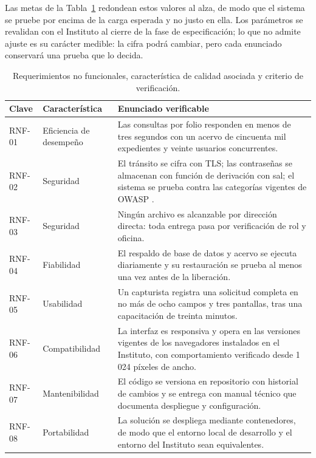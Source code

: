 Las metas de la Tabla~\ref{tab:rnf} redondean estos valores al alza, de modo que el sistema se pruebe por encima de la carga esperada y no justo en ella. Los parámetros se revalidan con el Instituto al cierre de la fase de especificación; lo que no admite ajuste es su carácter medible: la cifra podrá cambiar, pero cada enunciado conservará una prueba que lo decida.

\begin{table}[H]
  \centering
  \small
  \renewcommand{\arraystretch}{1.3}
  \caption{Requerimientos no funcionales, característica de calidad asociada y criterio de verificación.}
  \label{tab:rnf}
  \begin{tabularx}{\textwidth}{@{}>{\raggedright\arraybackslash}p{2.1cm}>{\raggedright\arraybackslash}p{2.9cm}>{\raggedright\arraybackslash}X@{}}
    \toprule
    \textbf{Clave} & \textbf{Característica} & \textbf{Enunciado verificable} \\
    \midrule
    RNF-01 & Eficiencia de desempeño & Las consultas por folio responden en menos de tres segundos con un acervo de cincuenta mil expedientes y veinte usuarios concurrentes. \\
    RNF-02 & Seguridad & El tránsito se cifra con TLS; las contraseñas se almacenan con función de derivación con sal; el sistema se prueba contra las categorías vigentes de OWASP \cite{owasp2021}. \\
    RNF-03 & Seguridad & Ningún archivo es alcanzable por dirección directa: toda entrega pasa por verificación de rol y oficina. \\
    RNF-04 & Fiabilidad & El respaldo de base de datos y acervo se ejecuta diariamente y su restauración se prueba al menos una vez antes de la liberación. \\
    RNF-05 & Usabilidad & Un capturista registra una solicitud completa en no más de ocho campos y tres pantallas, tras una capacitación de treinta minutos. \\
    RNF-06 & Compatibilidad & La interfaz es responsiva y opera en las versiones vigentes de los navegadores instalados en el Instituto, con comportamiento verificado desde 1\,024 píxeles de ancho. \\
    RNF-07 & Mantenibilidad & El código se versiona en repositorio con historial de cambios y se entrega con manual técnico que documenta despliegue y configuración. \\
    RNF-08 & Portabilidad & La solución se despliega mediante contenedores, de modo que el entorno local de desarrollo y el entorno del Instituto sean equivalentes. \\
    \bottomrule
  \end{tabularx}
\end{table}

